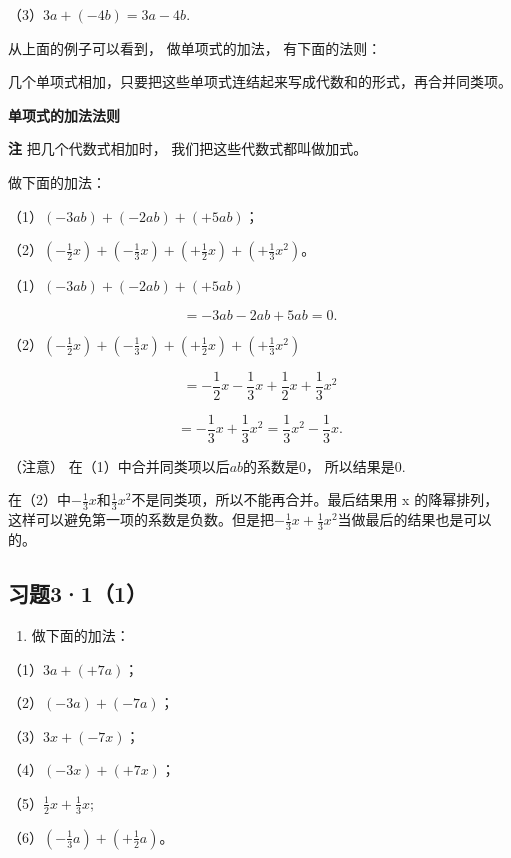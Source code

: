 （3）\(3a + (-4b) = 3a - 4b.\)

从上面的例子可以看到， 做单项式的加法， 有下面的法则：

几个单项式相加，只要把这些单项式连结起来写成代数和的形式，再合并同类项。

\textbf{单项式的加法法则}

\textbf{注} 把几个代数式相加时， 我们把这些代数式都叫做加式。

 做下面的加法：

（1）\((-3ab) + (-2ab) + (+5ab)\)；

（2）\(\left(-\frac{1}{2} x\right) + \left(-\frac{1}{3} x\right) + \left(+\frac{1}{2} x\right) + \left(+\frac{1}{3} x^2\right)\)。

 （1）\((-3ab) + (-2ab) + (+5ab)\)

\[
= - 3 a b - 2 a b + 5 a b = 0.
\]

（2）\(\left(-\frac{1}{2} x\right) + \left(-\frac{1}{3} x\right) + \left(+\frac{1}{2} x\right) + \left(+\frac{1}{3} x^2\right)\)

\[
= - \frac{1}{2} x - \frac{1}{3} x + \frac{1}{2} x + \frac{1}{3} x ^{2}
\]

\[
= - \frac{1}{3} x + \frac{1}{3} x ^{2} = \frac{1}{3} x ^{2} - \frac{1}{3} x.
\]

（注意） 在（1）中合并同类项以后\(ab\)的系数是0， 所以结果是0.

在（2）中\(-\frac{1}{3}x\)和\(\frac{1}{3}x^{2}\)不是同类项，所以不能再合并。最后结果用
x
的降幂排列，这样可以避免第一项的系数是负数。但是把\(-\frac{1}{3}x + \frac{1}{3}x^{2}\)当做最后的结果也是可以的。

\subsection{习题3·1（1）}

\begin{enumerate}
\item
  做下面的加法：
\end{enumerate}

（1）\(3a + (+7a)\)；

（2）\((-3a) + (-7a)\)；

（3）\(3x + (-7x)\)；

（4）\((-3x) + (+7x)\)；

（5）\(\frac{1}{2} x + \frac{1}{3} x;\)

（6）\(\left(-\frac{1}{3} a\right) + \left(+\frac{1}{2} a\right)\)。

